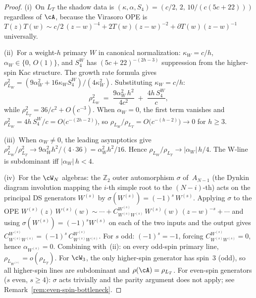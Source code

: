\begin{proof}
(i)~On $L_T$ the shadow data is
$(\kappa, \alpha, S_4) = (c/2,\, 2,\, 10/(c(5c{+}22)))$
regardless of $\cA$, because the Virasoro OPE is
$T(z) T(w) \sim c/2\,(z{-}w)^{-4} +
2T(w)(z{-}w)^{-2} + \partial T(w)(z{-}w)^{-1}$
universally.

(ii)~For a weight-$h$ primary $W$ in canonical normalization:
$\kappa_W = c/h$,
$\alpha_W \in \{0,\, O(1)\}$, and $S_4^W$ has
$(5c{+}22)^{-(2h-3)}$ suppression from the higher-spin
Kac structure.  The growth rate formula gives
$\rho_{L_W}^2 = (9\alpha_W^2 + 16\kappa_W S_4^W) /
(4\kappa_W^2)$.
Substituting $\kappa_W = c/h$:
\[
  \rho_{L_W}^2
  \;=\;
  \frac{9\alpha_W^2\,h^2}{4c^2}
  \;+\;
  \frac{4h\,S_4^W}{c},
\]
while $\rho_{L_T}^2 = 36/c^2 + O(c^{-3})$.
When $\alpha_W = 0$, the first term vanishes and
$\rho_{L_W}^2 = 4h\,S_4^W/c
= O\bigl(c^{-(2h-2)}\bigr)$,
so $\rho_{L_W}/\rho_{L_T} = O\bigl(c^{-(h-2)}\bigr) \to 0$
for $h \geq 3$.

(iii)~When $\alpha_W \neq 0$, the leading asymptotics
give
$\rho_{L_W}^2/\rho_{L_T}^2 \to
9\alpha_W^2 h^2/(4 \cdot 36) = \alpha_W^2 h^2/16$.
Hence $\rho_{L_W}/\rho_{L_T} \to |\alpha_W|\,h/4$.
The W-line is subdominant iff $|\alpha_W|\,h < 4$.

(iv)~For the $\cW_N$ algebras:
the $\mathbb{Z}_2$ outer automorphism $\sigma$
of~$A_{N-1}$ (the Dynkin diagram involution
mapping the $i$-th simple root to the $(N{-}i)$-th)
acts on the principal DS generators $W^{(s)}$ by
$\sigma(W^{(s)}) = (-1)^s\,W^{(s)}$.
Applying $\sigma$ to the OPE
$W^{(s)}(z)\,W^{(s)}(w) \sim \dotsb
+ C^{W^{(s)}}_{W^{(s)}W^{(s)}}\,
W^{(s)}(w)\,(z{-}w)^{-s} + \dotsb$
and using $\sigma(W^{(s)}) = (-1)^s W^{(s)}$
on each of the two inputs and the output gives
$C^{W^{(s)}}_{W^{(s)}W^{(s)}} =
(-1)^s\,C^{W^{(s)}}_{W^{(s)}W^{(s)}}$.
For $s$ odd: $(-1)^s = -1$, forcing
$C^{W^{(s)}}_{W^{(s)}W^{(s)}} = 0$,
hence $\alpha_{W^{(s)}} = 0$.
Combining with~(ii): on every odd-spin primary
line, $\rho_{L_{W^{(s)}}} = o(\rho_{L_T})$.
For $\cW_3$, the only higher-spin generator has
spin~$3$ (odd), so all higher-spin lines are
subdominant and $\rho(\cA) = \rho_{L_T}$.
For even-spin generators ($s$ even, $s \geq 4$):
$\sigma$ acts trivially and the parity argument does
not apply; see
Remark~\textup{\ref{rem:even-spin-bottleneck}}.
\end{proof}

